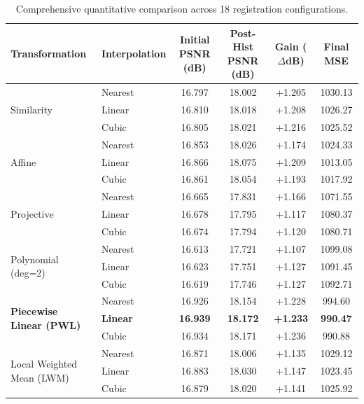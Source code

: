 \documentclass[11pt,a4paper]{article}
\begin{document}
\begin{table}[H]
\centering
\small
\caption{Comprehensive quantitative comparison across 18 registration configurations.}
\label{tab:classical_benchmark}
\begin{tabular}{llcccc}
\toprule
\textbf{Transformation} & \textbf{Interpolation} & \textbf{Initial PSNR (dB)} & \textbf{Post-Hist PSNR (dB)} & \textbf{Gain ($\Delta$dB)} & \textbf{Final MSE} \\
\midrule
\multirow{3}{*}{Similarity} 
 & Nearest & 16.797 & 18.002 & +1.205 & 1030.13 \\
 & Linear  & 16.810 & 18.018 & +1.208 & 1026.27 \\
 & Cubic   & 16.805 & 18.021 & +1.216 & 1025.52 \\
\midrule
\multirow{3}{*}{Affine} 
 & Nearest & 16.853 & 18.026 & +1.174 & 1024.33 \\
 & Linear  & 16.866 & 18.075 & +1.209 & 1013.05 \\
 & Cubic   & 16.861 & 18.054 & +1.193 & 1017.92 \\
\midrule
\multirow{3}{*}{Projective} 
 & Nearest & 16.665 & 17.831 & +1.166 & 1071.55 \\
 & Linear  & 16.678 & 17.795 & +1.117 & 1080.37 \\
 & Cubic   & 16.674 & 17.794 & +1.120 & 1080.71 \\
\midrule
\multirow{3}{*}{Polynomial (deg=2)} 
 & Nearest & 16.613 & 17.721 & +1.107 & 1099.08 \\
 & Linear  & 16.623 & 17.751 & +1.127 & 1091.45 \\
 & Cubic   & 16.619 & 17.746 & +1.127 & 1092.71 \\
\midrule
\multirow{3}{*}{\textbf{Piecewise Linear (PWL)}} 
 & Nearest & 16.926 & 18.154 & +1.228 & 994.60 \\
 & \textbf{Linear}  & \textbf{16.939} & \textbf{18.172} & \textbf{+1.233} & \textbf{990.47} \\
 & Cubic   & 16.934 & 18.171 & +1.236 & 990.88 \\
\midrule
\multirow{3}{*}{Local Weighted Mean (LWM)} 
 & Nearest & 16.871 & 18.006 & +1.135 & 1029.12 \\
 & Linear  & 16.883 & 18.030 & +1.147 & 1023.45 \\
 & Cubic   & 16.879 & 18.020 & +1.141 & 1025.92 \\
\bottomrule
\end{tabular}
\end{table}
\end{document}
